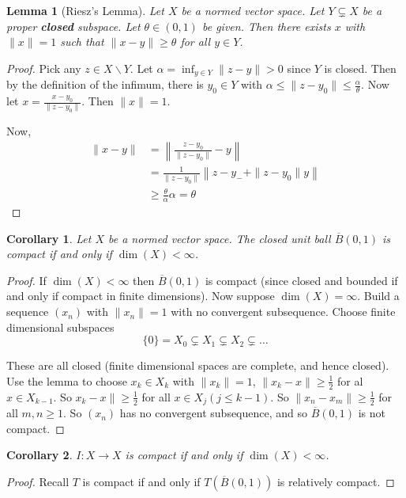 \documentclass[justified]{tufte-book}
\theoremstyle{plain}%
\newtheorem{lem}[thm]{Lemma}
\newtheorem*{cor}{Corollary}
\theoremstyle{definition}
\theoremstyle{remark}
\begin{document}
\begin{lem}[Riesz's Lemma]
  Let $X$ be a normed vector space.  Let $Y \subsetneq X$ be a proper \textbf{closed} subspace.  Let $\theta \in (0, 1)$ be given. Then there exists $x$ with $\| x \| = 1$ such that $\| x - y \| \geq \theta$ for all $y \in Y$.  
\end{lem}
\begin{proof}
  Pick any $z \in X \backslash Y$.  Let $\alpha = \inf_{y \in Y} \| z - y \| > 0$ since $Y$ is closed.  Then by the definition of the infimum, there is $y_0 \in Y$ with $\alpha \leq \| z - y_0 \| \leq \frac{\alpha}{\theta}$.  Now let $x = \frac{x - y_0}{\| z - y_0 \|}$.  Then $\| x \| = 1$.  
  
  Now, \begin{align*}
      \| x - y \| &= \left \| \frac{z - y_0}{\| z - y_0 \|} - y \right \| \\
                  &= \frac{1}{\| z - y_0 \|} \left \| z - y_- + \| z - y_0 \| y \right \| \\
                  &\geq \frac{\theta}{\alpha} \alpha = \theta
  \end{align*}
\end{proof}

\begin{cor}
  Let $X$ be a normed vector space.  The closed unit ball $\overline B(0, 1)$ is compact if and only if $\dim(X) < \infty$.  
\end{cor}
\begin{proof}
  If $\dim(X) < \infty$ then $\overline B(0, 1)$ is compact (since closed and bounded if and only if compact in finite dimensions).  Now suppose $\dim(X) = \infty$.  Build a sequence $(x_n)$ with $\| x_n \| = 1$ with no convergent subsequence.  Choose finite dimensional subspaces \[
      \{ 0 \} = X_0 \subsetneq X_1 \subsetneq X_2 \subsetneq \dots
  \]  
  
  These are all closed (finite dimensional spaces are complete, and hence closed).  Use the lemma to choose $x_k \in X_k$ with $\| x_k \| = 1$, $\| x_k - x \| \geq \frac{1}{2}$ for al $ x \in X_{k-1}$.  So $x_k - x \| \geq \frac{1}{2}$ for all $x \in X_j (j \leq k - 1)$.  So $\| x_n - x_m \| \geq \frac{1}{2}$ for all $m , n \geq 1$.  So $(x_n)$ has no convergent subsequence, and so $\overline B(0, 1)$ is not compact.  
\end{proof}
\begin{cor}
  $I : X \rightarrow X$ is compact if and only if $\dim(X) < \infty$.  
\end{cor}
\begin{proof}
  Recall $T$ is compact if and only if $T(\overline B(0, 1))$ is relatively compact.  
\end{proof}
\end{document}
